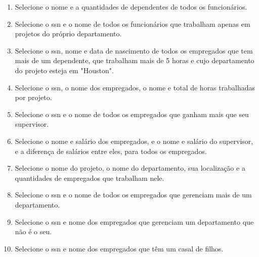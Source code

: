 \documentclass[11pt]{article}
\begin{document}
\begin{enumerate}
		\item Selecione o nome e a quantidades de dependentes de todos os funcionários.
		
		\item Selecione o ssn e o nome de todos os funcionários que trabalham apenas em projetos do próprio
		departamento.
		
		\item Selecione o ssn, nome e data de nascimento de todos os empregados que tem mais de um
		dependente, que trabalham mais de 5 horas e cujo departamento do projeto esteja em
		"Houston".
		
		\item Selecione o ssn, o nome dos empregados, o nome e total de horas trabalhadas por projeto.
		
		\item Selecione o ssn e o nome de todos os empregados que ganham mais que seu supervisor.
		
		\item Selecione o nome e salário dos empregados, e o nome e salário do supervisor, e a diferença de
		salários entre eles, para todos os empregados.
		
		\item Selecione o nome do projeto, o nome do departamento, sua localização e a quantidades de
		empregados que trabalham nele.
		
		\item Selecione o ssn e o nome de todos os empregados que gerenciam mais de um departamento.
		
		\item Selecione o ssn e nome dos empregados que gerenciam um departamento que não é o seu.
		
		\item Selecione o ssn e nome dos empregados que têm um casal de filhos.
	\end{enumerate}
	
\end{document}
